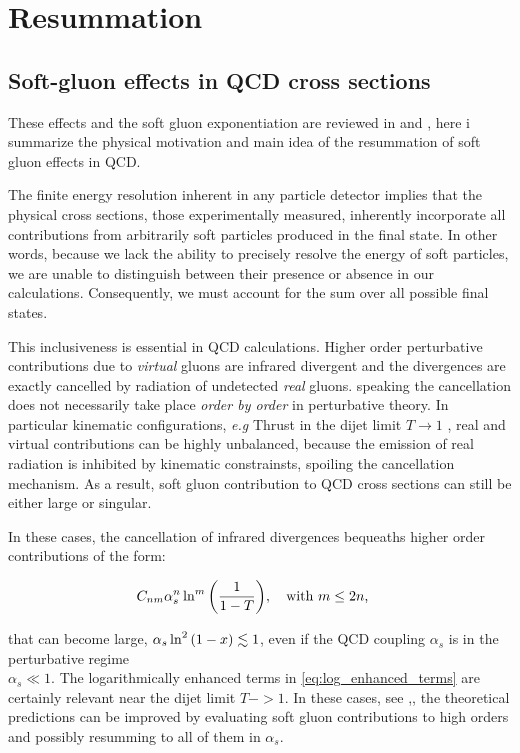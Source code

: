 \documentclass[../main.tex]{subfiles}
\begin{document}
\section{Resummation}


\subsection{Soft-gluon effects in QCD cross sections}

These effects and the soft gluon exponentiation are reviewed in \cite{Catani_1997} and \cite{catani1997softgluon}, here i summarize the physical 
motivation and main idea of the resummation of soft gluon effects in QCD.

The finite energy resolution inherent in any particle detector implies that the physical cross sections, 
those experimentally measured, inherently incorporate all contributions from arbitrarily soft particles 
produced in the final state. In other words, because we lack the ability to precisely resolve the energy 
of soft particles, we are unable to distinguish between their presence or absence in our calculations. 
Consequently, we must account for the sum over all possible final states.

This inclusiveness is essential in QCD calculations. Higher order perturbative contributions due to \emph{virtual}
gluons are infrared divergent and the divergences are exactly  cancelled by radiation of undetected \emph{real} gluons.
speaking the cancellation does not necessarily take place \emph{order by order} in perturbative theory.
In particular kinematic configurations, \emph{e.g} Thrust in the dijet limit $T \to 1$ ,   
real and virtual contributions can be highly unbalanced, because the emission of real radiation is inhibited by kinematic constrainsts,
spoiling the cancellation mechanism. As a result, soft gluon contribution to QCD cross sections can still be either large or singular.

In these cases, the cancellation of infrared divergences bequeaths higher order contributions of the form:

\begin{equation}\label{eq:log_enhanced_terms}
    C_{nm} \alpha_s^n \ln^m\qty(\frac{1}{1-T}) , \qq{with $m \le 2n $,}
\end{equation}

that can become large, $\alpha_s \ln^2\qty(1-x)\lesssim 1$, even if the QCD coupling $\alpha_s$ is in the perturbative regime \\
$\alpha_s \ll 1$.
The logarithmically enhanced terms in \cref{eq:log_enhanced_terms} are certainly relevant near the dijet limit $T->1$.
In these cases, see \cite{CATANI19933},\cite{Catani:2003zt}, the theoretical predictions can be improved by evaluating soft gluon 
contributions to high orders and possibly resumming to all of them in $\alpha_s$.
\end{document}
